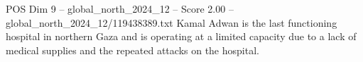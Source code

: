 \begin{textsample}{POS Dim 9 – global\_north\_2024\_12 – Score 2.00 – global\_north\_2024\_12/119438389.txt}
Kamal Adwan is the last functioning hospital in northern Gaza and is operating at a limited capacity due to a lack of medical supplies and the repeated attacks on the hospital.

\end{textsample}
